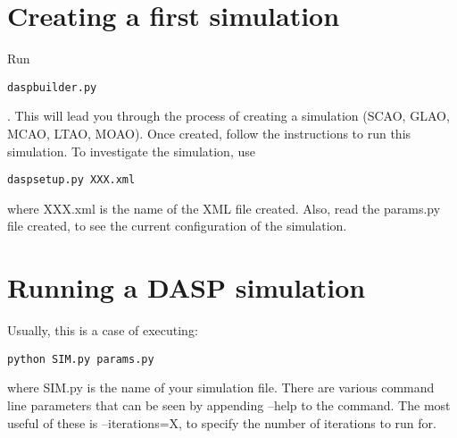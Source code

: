 \documentclass{article}
\begin{document}
\section{Creating a first simulation}
Run \begin{verbatim}daspbuilder.py\end{verbatim}.  This will lead you
  through the process of creating a simulation (SCAO, GLAO, MCAO,
  LTAO, MOAO).  Once created, follow the instructions to run this
  simulation.  To investigate the simulation,
  use \begin{verbatim}daspsetup.py XXX.xml\end{verbatim} where XXX.xml
  is the name of the XML file created.  Also, read the params.py file
  created, to see the current configuration of the simulation.

\section{Running a DASP simulation}
Usually, this is a case of executing:
\begin{verbatim}
python SIM.py params.py
\end{verbatim}
where SIM.py is the name of your simulation file.  There are various
command line parameters that can be seen by appending --help to the
command.  The most useful of these is --iterations=X, to specify the
number of iterations to run for.
\end{document}
